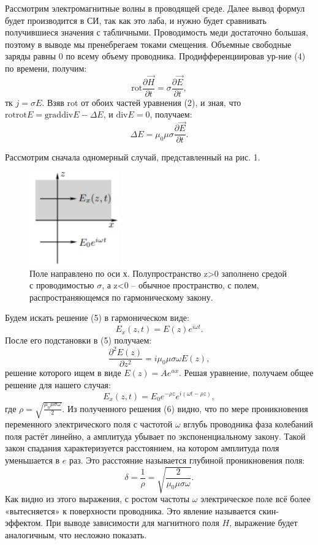 \documentclass[a4paper, 14pt]{extarticle}%
\newcommand\ECaption[1]{%
     \captionsetup{font=footnotesize}%
     \caption{#1}}
\begin{document}
Рассмотрим электромагнитные волны в проводящей среде. Далее вывод формул будет производится в СИ, так как это лаба, и нужно будет сравнивать получившиеся значения с табличными. Проводимость меди достаточно большая, поэтому в выводе мы пренебрегаем токами смещения. Объемные свободные заряды равны 0 по всему объему проводника. Продифференциировав ур-ние (4) по времени, получим:
\[\text{rot}\dfrac{\partial\overrightarrow{H}}{\partial t} = \sigma\dfrac{\partial\overrightarrow{E}}{\partial t},\]
тк $j = \sigma E$. Взяв rot от обоих частей уравнения (2), и зная, что $\text{rotrot}E = \text{graddiv}E - \Delta E$, и $\text{div} E = 0$, получаем:
\begin{equation}
\Delta E = \mu_0\mu\sigma\dfrac{\partial\overrightarrow{E}}{\partial t}.
\end{equation}

Рассмотрим сначала одномерный случай, представленный на рис. 1.

\begin{figure}
\begin{center}
\includegraphics[height=4cm]{teor1.png}
\end{center}
\ECaption{Поле направлено по оси х. Полупространство z>0 заполнено средой с проводимостью $\sigma$, а z<0 -- обычное пространство, с полем, распространяющемся по гармоническому закону.}
\end{figure}

Будем искать решение (5) в гармоническом виде:
\[E_x(z,t) = E(z)e^{i\omega t}.\] 
После его подстановки в (5) получаем:
\[\dfrac{\partial^2E(z)}{\partial z^2} = i\mu_0\mu\sigma\omega E(z),\]
решение которого ищем в виде $E(z) = Ae^{\alpha x}$. Решая уравнение, получаем общее решение для нашего случая:
\begin{equation}
E_x(z,t) = E_0e^{-\rho z}e^{i(\omega t - \rho z)},
\end{equation}
где $\rho =\sqrt{ \frac{\mu_0\mu\sigma\omega}{2}}$.
Из полученного решения (6) видно, что по мере проникновения переменного
электрического поля с частотой
$\omega$ вглубь проводника фаза
колебаний поля
растёт линейно, а амплитуда убывает по экспоненциальному закону. Такой
закон спадания
характеризуется расстоянием, на
котором амплитуда поля
уменьшается в $e$ раз. Это расстояние называется глубиной проникновения
поля:
\begin{equation}
\delta = \dfrac{1}{\rho}=\sqrt{\dfrac{2}{\mu_0\mu\sigma\omega}}.
\end{equation}
Как видно из этого выражения, с ростом частоты
$\omega$ электрическое поле
всё более «вытесняется»
к поверхности проводника. Это явление называется
скин-эффектом. При выводе зависимости для магнитного поля $H$, выражение будет аналогичным, что несложно показать.
\end{document}

